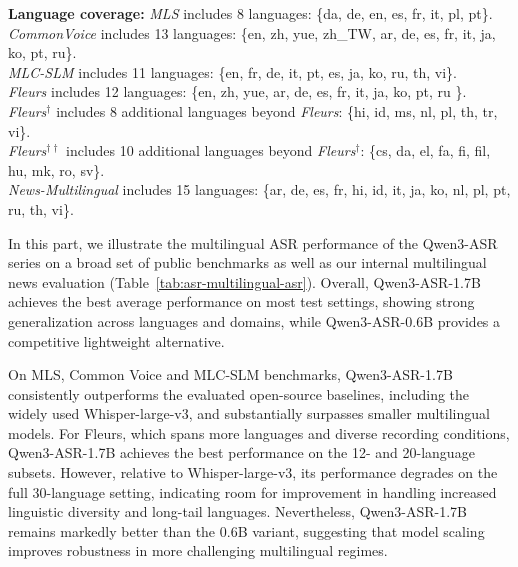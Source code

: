 \begin{table}[ht]
\begin{threeparttable}
{}
\begin{tablenotes}
\footnotesize
\begin{minipage}{\textwidth}
\item \textbf{Language coverage:} 
\textit{MLS} includes 8 languages: \{da, de, en, es, fr, it, pl, pt\}. \\
\textit{CommonVoice} includes 13 languages: \{en, zh, yue, zh\_TW, ar, de, es, fr, it, ja, ko, pt, ru\}. \\
\textit{MLC-SLM} includes 11 languages: \{en, fr, de, it, pt, es, ja, ko, ru, th, vi\}. \\
\textit{Fleurs} includes 12 languages: \{en, zh, yue, ar, de, es, fr, it, ja, ko, pt, ru \}. \\
\textit{Fleurs$^{\dagger}$} includes 8 additional languages beyond \textit{Fleurs}: \{hi, id, ms, nl, pl, th, tr, vi\}. \\
\textit{Fleurs$^{\dagger\dagger}$} includes 10 additional languages beyond \textit{Fleurs$^{\dagger}$}: \{cs, da, el, fa, fi, fil, hu, mk, ro, sv\}. \\
\textit{News-Multilingual} includes 15 languages: \{ar, de, es, fr, hi, id, it, ja, ko, nl, pl, pt, ru, th, vi\}.
\end{minipage}
\end{tablenotes}
\end{threeparttable}
\end{table}


In this part, we illustrate the multilingual ASR performance of the Qwen3-ASR series on a broad set of public benchmarks as well as our internal multilingual news evaluation (Table~\ref{tab:asr-multilingual-asr}). Overall, Qwen3-ASR-1.7B achieves the best average performance on most test settings, showing strong generalization across languages and domains, while Qwen3-ASR-0.6B provides a competitive lightweight alternative.

On MLS, Common Voice and MLC-SLM benchmarks, Qwen3-ASR-1.7B consistently outperforms the evaluated open-source baselines, including the widely used Whisper-large-v3, and substantially surpasses smaller multilingual models. For Fleurs, which spans more languages and diverse recording conditions, Qwen3-ASR-1.7B achieves the best performance on the 12- and 20-language subsets. However, relative to Whisper-large-v3, its performance degrades on the full 30-language setting, indicating room for improvement in handling increased linguistic diversity and long-tail languages. Nevertheless, Qwen3-ASR-1.7B remains markedly better than the 0.6B variant, suggesting that model scaling improves robustness in more challenging multilingual regimes.


